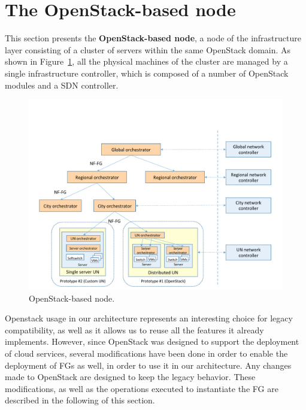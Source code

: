 \section{The OpenStack-based node}
\label{sec:os-proto}


This section presents the \textbf{OpenStack-based node}, a node of the infrastructure layer consisting of a cluster of servers within the same OpenStack domain.
As shown in Figure~\ref{fig:proto_openstack}, all the physical machines of the cluster are managed by a single infrastructure controller, which is composed of a number of OpenStack modules and a SDN controller. 

\begin{figure}%
	\centering
	\includegraphics[clip= true, width= 1\columnwidth, trim= 0in 0.8in 0.0in 0in, page = 24]{images/Pictures_definitivo.pdf}
	\caption{OpenStack-based node.}
	\label{fig:proto_openstack}
\end{figure}

Openstack usage in our architecture represents an interesting choice for legacy compatibility, as well as it allows us to reuse all the features it already implements.
However, since OpenStack was designed to support the deployment of cloud services,  several modifications have been done in order to enable the deployment of FGs as well, in order to use it in our architecture. Any changes made to OpenStack are designed to keep the legacy behavior.
These modifications, as well as the operations executed to instantiate the FG are described in the following of this section.

